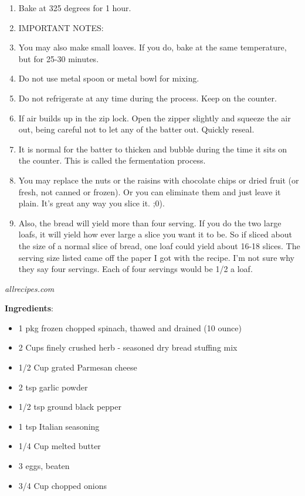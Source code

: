\documentclass[11pt, twoside, openany]{book}
\begin{document}
\begin{enumerate}
\item Bake at 325 degrees for 1 hour.
\item IMPORTANT NOTES:
\item You may also make small loaves. If you do, bake at the same temperature, but for 25-30 minutes.
\item Do not use metal spoon or metal bowl for mixing.
\item Do not refrigerate at any time during the process. Keep on the counter.
\item If air builds up in the zip lock. Open the zipper slightly and squeeze the air out, being careful not to let any of the batter out. Quickly reseal.
\item It is normal for the batter to thicken and bubble during the time it sits on the counter. This is called the fermentation process.
\item You may replace the nuts or the raisins with chocolate chips or dried fruit (or fresh, not canned or frozen). Or you can eliminate them and just leave it plain. It's great any way you slice it. ;0).
\item Also, the bread will yield more than four serving. If you do the two large loafs, it will yield how ever large a slice you want it to be. So if sliced about the size of a normal slice of bread, one loaf could yield about 16-18 slices. The serving size listed came off the paper I got with the recipe. I'm not sure why they say four servings. Each of four servings would be 1/2 a loaf.
\end{enumerate}
 \label{spinach-balls}\hfill\textit{allrecipes.com}\\
\begin{minipage}[t]{0.8\linewidth}
\textbf{Ingredients}:\vspace{-3mm}
\begin{multicols}{2}
\begin{itemize}\setlength\itemsep{-1mm}
\item 1 pkg frozen chopped spinach, thawed and drained (10 ounce)
\item 2 Cups finely crushed herb - seasoned dry bread stuffing mix
\item 1/2 Cup grated Parmesan cheese
\item 2 tsp garlic powder
\item 1/2 tsp ground black pepper
\item 1 tsp Italian seasoning
\item 1/4 Cup melted butter
\item 3 eggs, beaten
\item 3/4 Cup chopped onions
\end{itemize}
\end{multicols}
\end{minipage}
\end{document}
